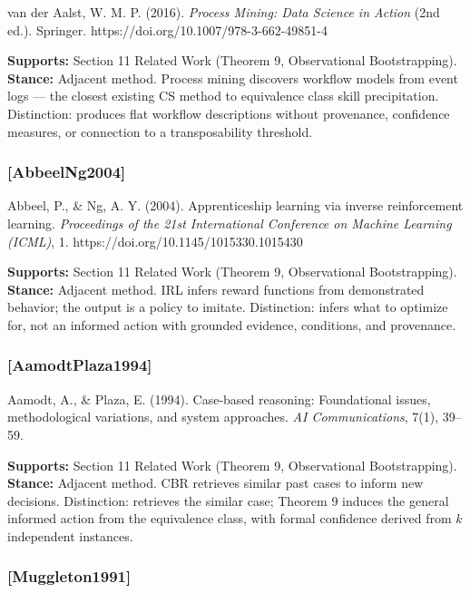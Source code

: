 \documentclass[
]{article}
\begin{document}
van der Aalst, W. M. P. (2016). \emph{Process Mining: Data Science in
Action} (2nd ed.). Springer. https://doi.org/10.1007/978-3-662-49851-4

\textbf{Supports:} Section 11 Related Work (Theorem 9, Observational
Bootstrapping). \textbf{Stance:} Adjacent method. Process mining
discovers workflow models from event logs --- the closest existing CS
method to equivalence class skill precipitation. Distinction: produces
flat workflow descriptions without provenance, confidence measures, or
connection to a transposability threshold.

\subsubsection{{[}AbbeelNg2004{]}}\label{abbeelng2004}

Abbeel, P., \& Ng, A. Y. (2004). Apprenticeship learning via inverse
reinforcement learning. \emph{Proceedings of the 21st International
Conference on Machine Learning (ICML)}, 1.
https://doi.org/10.1145/1015330.1015430

\textbf{Supports:} Section 11 Related Work (Theorem 9, Observational
Bootstrapping). \textbf{Stance:} Adjacent method. IRL infers reward
functions from demonstrated behavior; the output is a policy to imitate.
Distinction: infers what to optimize for, not an informed action with
grounded evidence, conditions, and provenance.

\subsubsection{{[}AamodtPlaza1994{]}}\label{aamodtplaza1994}

Aamodt, A., \& Plaza, E. (1994). Case-based reasoning: Foundational
issues, methodological variations, and system approaches. \emph{AI
Communications}, 7(1), 39--59.

\textbf{Supports:} Section 11 Related Work (Theorem 9, Observational
Bootstrapping). \textbf{Stance:} Adjacent method. CBR retrieves similar
past cases to inform new decisions. Distinction: retrieves the similar
case; Theorem 9 induces the general informed action from the equivalence
class, with formal confidence derived from \(k\) independent instances.

\subsubsection{{[}Muggleton1991{]}}\label{muggleton1991}
\end{document}
